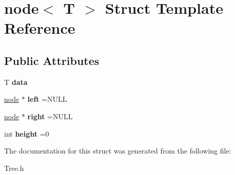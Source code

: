 \hypertarget{structnode}{}\section{node$<$ T $>$ Struct Template Reference}
\label{structnode}
\subsection*{Public Attributes}
\begin{DoxyCompactItemize}
\item 
\hypertarget{structnode_a0a3e961e5caf1562f0c27caef3940e7a}{}\label{structnode_a0a3e961e5caf1562f0c27caef3940e7a} 
T {\bfseries data}
\item 
\hypertarget{structnode_ac7cfc33e386ed2a416407a3cc073d089}{}\label{structnode_ac7cfc33e386ed2a416407a3cc073d089} 
\hyperlink{structnode}{node} $\ast$ {\bfseries left} =N\+U\+LL
\item 
\hypertarget{structnode_acb9c99bdeb8c894abbf2078717784d5c}{}\label{structnode_acb9c99bdeb8c894abbf2078717784d5c} 
\hyperlink{structnode}{node} $\ast$ {\bfseries right} =N\+U\+LL
\item 
\hypertarget{structnode_a078de0394a08b6bde8ac518413eec14c}{}\label{structnode_a078de0394a08b6bde8ac518413eec14c} 
int {\bfseries height} =0
\end{DoxyCompactItemize}


The documentation for this struct was generated from the following file\+:\begin{DoxyCompactItemize}
\item 
Tree.\+h\end{DoxyCompactItemize}
